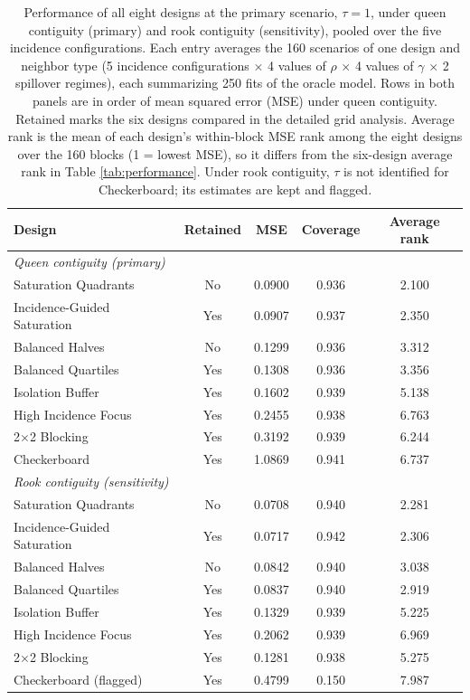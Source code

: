 \documentclass[11pt]{article}
\begin{document}
\begin{table}[!htb]

\small
\centering

\caption{Performance of all eight designs at the primary scenario, $\tau = 1$, under queen contiguity (primary) and rook contiguity (sensitivity), pooled over the five incidence configurations. Each entry averages the 160 scenarios of one design and neighbor type (5 incidence configurations $\times$ 4 values of $\rho$ $\times$ 4 values of $\gamma$ $\times$ 2 spillover regimes), each summarizing 250 fits of the oracle model. Rows in both panels are in order of mean squared error (MSE) under queen contiguity. Retained marks the six designs compared in the detailed grid analysis. Average rank is the mean of each design's within-block MSE rank among the eight designs over the 160 blocks (1 = lowest MSE), so it differs from the six-design average rank in Table \ref{tab:performance}. Under rook contiguity, $\tau$ is not identified for Checkerboard; its estimates are kept and flagged.}
\label{tab:eight-design}

\begin{tabular}{lcccc}

\toprule
Design & Retained & MSE & Coverage & Average rank \\

\midrule
\multicolumn{5}{l}{\textit{Queen contiguity (primary)}} \\
Saturation Quadrants & No & 0.0900 & 0.936 & 2.100 \\
Incidence-Guided Saturation & Yes & 0.0907 & 0.937 & 2.350 \\
Balanced Halves & No & 0.1299 & 0.936 & 3.312 \\
Balanced Quartiles & Yes & 0.1308 & 0.936 & 3.356 \\
Isolation Buffer & Yes & 0.1602 & 0.939 & 5.138 \\
High Incidence Focus & Yes & 0.2455 & 0.938 & 6.763 \\
2$\times$2 Blocking & Yes & 0.3192 & 0.939 & 6.244 \\
Checkerboard & Yes & 1.0869 & 0.941 & 6.737 \\

\midrule
\multicolumn{5}{l}{\textit{Rook contiguity (sensitivity)}} \\
Saturation Quadrants & No & 0.0708 & 0.940 & 2.281 \\
Incidence-Guided Saturation & Yes & 0.0717 & 0.942 & 2.306 \\
Balanced Halves & No & 0.0842 & 0.940 & 3.038 \\
Balanced Quartiles & Yes & 0.0837 & 0.940 & 2.919 \\
Isolation Buffer & Yes & 0.1329 & 0.939 & 5.225 \\
High Incidence Focus & Yes & 0.2062 & 0.939 & 6.969 \\
2$\times$2 Blocking & Yes & 0.1281 & 0.938 & 5.275 \\
Checkerboard (flagged) & Yes & 0.4799 & 0.150 & 7.987 \\


\end{tabular}
\end{table}
\end{document}
